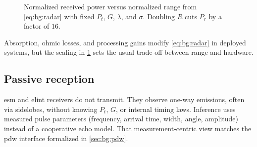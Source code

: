 \begin{figure}[t]
\centering
{}
\caption{Normalized received power versus normalized range from \cref{eq:bg:radar} with fixed $P_t$, $G$, $\lambda$, and $\sigma$. Doubling $R$ cuts $P_r$ by a factor of $16$.}
\label{fig:bg:radar_r4}
\end{figure}

Absorption, ohmic losses, and processing gains modify \cref{eq:bg:radar} in deployed systems, but the scaling in \cref{fig:bg:radar_r4} sets the usual trade-off between range and hardware.

\subsection{Passive reception}

\Gls{esm} and \gls{elint} receivers do not transmit. They observe one-way emissions, often via sidelobes, without knowing $P_t$, $G$, or internal timing laws. Inference uses measured pulse parameters (frequency, arrival time, width, angle, amplitude) instead of a cooperative echo model. That measurement-centric view matches the \gls{pdw} interface formalized in \cref{sec:bg:pdw}.
